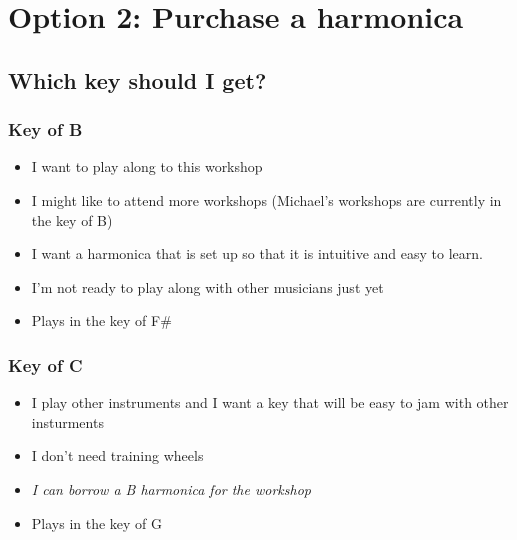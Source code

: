 \newpage
\section*{Option 2: Purchase a harmonica}
    
\subsection*{Which key should I get?}
\subsubsection*{Key of B} 
    \begin{itemize}
        \item I want to play along to this workshop
        \item I might like to attend more workshops (Michael's workshops are currently in the key of B)
        \item I want a harmonica that is set up so that it is intuitive and easy to learn.
        \item  I'm not ready to play along with other musicians just yet
        \item Plays in the key of F\#
\end{itemize}

\subsubsection*{Key of C} 
        \begin{itemize}
            \item I play other instruments and I want a key that will be easy to jam with other insturments
            \item I don't need training wheels
            \item \textit{I can borrow a B harmonica for the workshop}
            \item Plays in the key of G
        \end{itemize}

